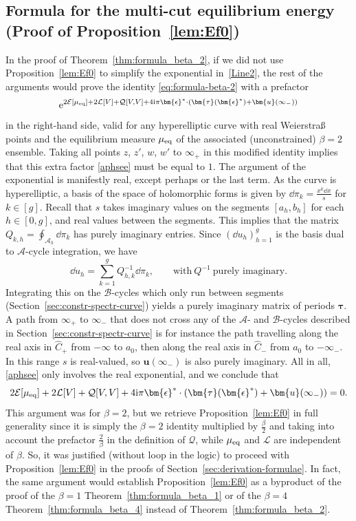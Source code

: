 \documentclass[10pt,a4paper]{amsart}
\numberwithin{equation}{section}
\begin{document}
\subsection{Formula for the multi-cut equilibrium energy (Proof of Proposition~\ref{lem:Ef0})}
\label{sec:can}
In the proof of Theorem~\ref{thm:formula_beta_2}, if we did not use Proposition~\ref{lem:Ef0} to simplify the exponential in~\eqref{Line2}, the rest of the arguments would prove the identity \eqref{eq:formula-beta-2} with a prefactor
\begin{equation}
\label{aphsee}{\rm e}^{2\mathcal{E}[\mu_{{\rm eq}}] + 2\mathcal{L}[V] + \mathcal{Q}[V,V] + 4{\rm i}\pi \bm{\epsilon}^* \cdot (\bm{\tau}(\bm{\epsilon}^*) + \bm{u}(\infty_-))}
\end{equation}
in the right-hand side, valid for any hyperelliptic curve with real Weierstra\ss{} points and the equilibrium measure $\mu_{{\rm eq}}$ of the associated (unconstrained) $\beta = 2$ ensemble. Taking all points $z$, $z'$, $w$, $w'$ to $\infty_+$ in this modified identity implies that this extra factor \eqref{aphsee} must be equal to $1$. The argument of the exponential is manifestly real, except perhaps or the last term. As the curve is hyperelliptic, a basis of the space of holomorphic forms is given by $\dd \pi_k = \frac{x^{k} \dd x}{s}$ for $k \in [g]$. Recall that $s$ takes imaginary values on the segments $[a_h,b_h]$ for each $h \in [0,g]$, and real values between the segments. This implies that the matrix $Q_{k,h} = \oint_{\mathcal{A}_{h}} \dd \pi_k$ has purely imaginary entries. Since $(\dd u_h)_{h = 1}^{g}$ is the basis dual to $\mathcal{A}$-cycle integration, we have
\[
\dd u_h = \sum_{k = 1}^{g} Q^{-1}_{h,k} \dd \pi_k,\qquad \text{with}\ Q^{-1}\ \text{purely imaginary}.
\]
Integrating this on the $\mathcal{B}$-cycles which only run between segments (Section~\ref{sec:constr-spectr-curve}) yields a purely imaginary matrix of periods $\bm{\tau}$. A path from $\infty_+$ to $\infty_-$ that does not cross any of the $\mathcal{A}$- and $\mathcal{B}$-cycles described in Section~\ref{sec:constr-spectr-curve} is for instance the path travelling along the real axis in $\widehat{C}_+$ from $-\infty$ to $a_0$, then along the real axis in $\widehat{C}_-$ from $a_0$ to $-\infty_-$. In this range $s$ is real-valued, so $\bm{u}(\infty_-)$ is also purely imaginary. All in all, \eqref{aphsee} only involves the real exponential, and we conclude that
\[
2\mathcal{E}[\mu_{{\rm eq}}] + 2\mathcal{L}[V] + \mathcal{Q}[V,V] + 4{\rm i}\pi \bm{\epsilon}^* \cdot (\bm{\tau}(\bm{\epsilon}^*) + \bm{u}(\infty_-)) = 0.
\]
This argument was for $\beta = 2$, but we retrieve Proposition~\ref{lem:Ef0} in full generality since it is simply the $\beta = 2$ identity multiplied by $\frac{\beta}{2}$ and taking into account the prefactor $\frac{2}{\beta}$ in the definition of $\mathcal{Q}$, while $\mu_{{\rm eq}}$ and $\mathcal{L}$ are independent of $\beta$. So, it was justified (without loop in the logic) to proceed with Proposition~\ref{lem:Ef0} in the proofs of Section~\ref{sec:derivation-formulae}. In fact, the same argument would establish Proposition~\ref{lem:Ef0} as a byproduct of the proof of the $\beta = 1$ Theorem~\ref{thm:formula_beta_1} or of the $\beta = 4$ Theorem~\ref{thm:formula_beta_4} instead of Theorem~\ref{thm:formula_beta_2}.
\end{document}
